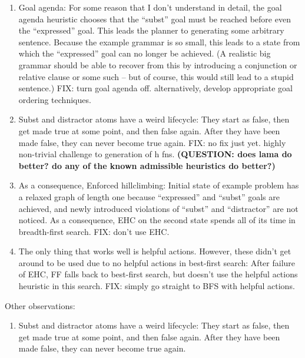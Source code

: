 \begin{enumerate}
\item Goal agenda: For some reason that I don't understand in detail,
  the goal agenda heuristic chooses that the ``subst'' goal must be
  reached before even the ``expressed'' goal. This leads the planner
  to generating some arbitrary sentence. Because the example grammar
  is so small, this leads to a state from which the ``expressed'' goal
  can no longer be achieved. (A realistic big grammar should be able
  to recover from this by introducing a conjunction or relative clause
  or some such -- but of course, this would still lead to a stupid
  sentence.) FIX: turn goal agenda off. alternatively, develop
  appropriate goal ordering techniques.
\item Subst and distractor atoms have a weird lifecycle: They start as
  false, then get made true at some point, and then false again.
  After they have been made false, they can never become true
  again. FIX: no fix just yet. highly non-trivial challenge to
  generation of h fns. {\bf (QUESTION: does lama do better? do any of
    the known admissible heuristics do better?)}
\item As a consequence, Enforced hillclimbing: Initial state of
  example problem has a relaxed graph of length one because
  ``expressed'' and ``subst'' goals are achieved, and newly introduced
  violations of ``subst'' and ``distractor'' are not noticed. As a
  consequence, EHC on the second state spends all of its time in
  breadth-first search. FIX: don't use EHC.
\item The only thing that works well is helpful actions. However,
  these didn't get around to be used due to no helpful actions in
  best-first search: After failure of EHC, FF falls back to best-first
  search, but doesn't use the helpful actions heuristic in this
  search. FIX: simply go straight to BFS with helpful actions.
\end{enumerate}


Other observations:

\begin{enumerate}
\item Subst and distractor atoms have a weird lifecycle: They start as
  false, then get made true at some point, and then false again.
  After they have been made false, they can never become true again.
\end{enumerate}






